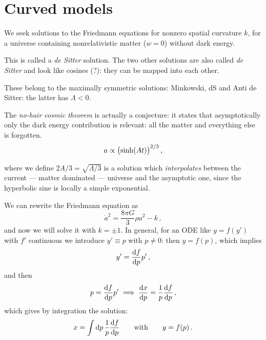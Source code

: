 \documentclass[main.tex]{subfiles}
\begin{document}
\section{Curved models}

We seek solutions to the Friedmann equations for nonzero spatial curvature \(k\), for a universe containing nonrelativistic matter (\(w=0\)) without dark energy.

This is called a \emph{de Sitter} solution.
The two other solutions are also called \emph{de Sitter} and look like cosines (?): they can be mapped into each other.


These belong to the maximally symmetric solutions: Minkowski, dS and Anti de Sitter: the latter has \(\Lambda < 0\).


The \emph{no-hair cosmic theorem} is actually a conjecture: it states that asymptotically only the dark energy contribution is relevant: all the matter and everything else is forgotten. 
%
\begin{equation}
  a \propto \qty(\sinh(At))^{2/3}
\,,
\end{equation}
%

where we define \(2A/3 = \sqrt{\Lambda /3} \) is a solution which \emph{interpolates} between the current --- matter dominated --- universe and the asymptotic one, since the hyperbolic sine is locally a simple exponential.

We can rewrite the Friedmann equation as 
%
\begin{equation}
  \dot{a}^2 = \frac{8 \pi G}{3} \rho a^2 - k
\,,
\end{equation}
%
and now we will solve it with \(k = \pm 1\).
In general, for an ODE like \(y = f(y')\) with \(f'\) continuous we introduce \(y' \equiv p\) with \(p \neq 0\): then \(y = f(p)\), which implies 
%
\begin{equation}
  y' = \dv{f}{p} p'
\,,
\end{equation}
%
and then 
%
\begin{equation}
  p = \dv{f}{p} p' \implies \dv{x}{p} = \frac{1}{p} \dv{f}{p}
\,,
\end{equation}
%
which gives by integration the solution: 
%
\begin{equation}
  x = \int  \dd{p} \frac{1}{p} \dv{f}{p}
  \qquad \text{with} \qquad
  y = f(p)
\,.
\end{equation}
\end{document}
